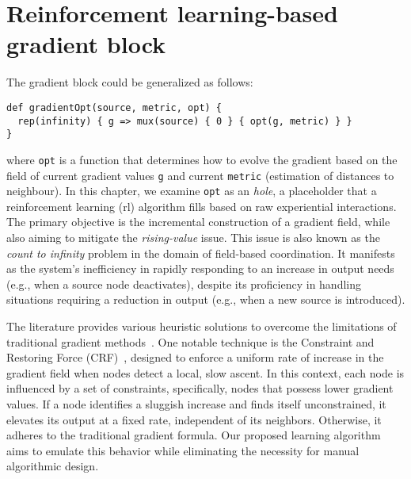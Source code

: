 \section{Reinforcement learning-based gradient block}
The gradient block could be generalized as follows:
\begin{lstlisting}
def gradientOpt(source, metric, opt) {
  rep(infinity) { g => mux(source) { 0 } { opt(g, metric) } }
}
\end{lstlisting}
where \lstinline|opt| is a function that determines how to evolve the gradient based on the field of current gradient values \lstinline|g| and current \lstinline|metric| (estimation of distances to neighbour). 
In this chapter, we examine \lstinline|opt| as an \emph{hole}, 
 a placeholder that a reinforcement learning (\ac{rl}) algorithm fills based on raw experiential interactions. 
 The primary objective is the incremental construction of a gradient field, while also aiming to mitigate the \emph{rising-value} issue. 
 This issue is also known as the \emph{count to infinity} problem in the domain of field-based coordination. 
 It manifests as the system's inefficiency in rapidly responding to an increase in output needs (e.g., when a source node deactivates), 
 despite its proficiency in handling situations requiring a reduction in output (e.g., when a new source is introduced).

The literature provides various heuristic solutions to overcome the limitations of traditional gradient methods~\cite{DBLP:conf/saso/AudritoCDV17}. 
 One notable technique is the Constraint and Restoring Force (CRF)~\cite{DBLP:conf/sac/BealBVT08}, 
 designed to enforce a uniform rate of increase in the gradient field when nodes detect a local, slow ascent. 
 In this context, each node is influenced by a set of constraints, specifically, nodes that possess lower gradient values. 
 If a node identifies a sluggish increase and finds itself unconstrained, it elevates its output at a fixed rate, independent of its neighbors. 
 Otherwise, it adheres to the traditional gradient formula. 
 Our proposed learning algorithm aims to emulate this behavior while eliminating the necessity for manual algorithmic design.

